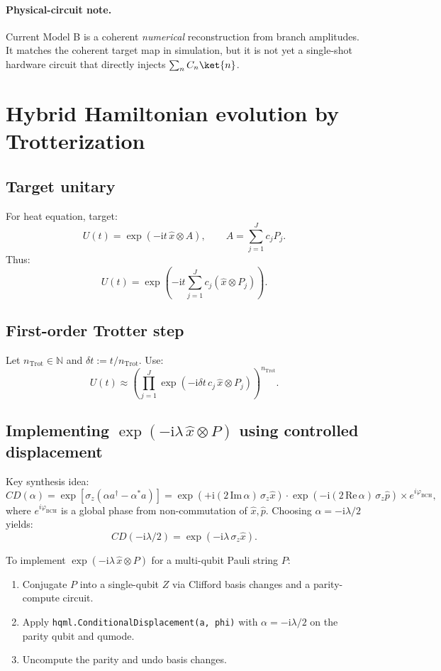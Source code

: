 \documentclass[11pt]{article}
\newcommand{\ii}{\mathrm{i}}
\begin{document}
\paragraph{Physical-circuit note.}
Current Model B is a coherent \emph{numerical} reconstruction from branch amplitudes.
It matches the coherent target map in simulation, but it is not yet a single-shot
hardware circuit that directly injects \(\sum_n C_n\ket{n}\).

\section{Hybrid Hamiltonian evolution by Trotterization}
\label{sec:trotter}

\subsection{Target unitary}
For heat equation, target:
\[
U(t)=\exp(-\ii t\,\hat{x}\otimes A),\qquad A=\sum_{j=1}^{J} c_j P_j.
\]
Thus:
\[
U(t)=\exp\left(-\ii t\sum_{j=1}^{J} c_j(\hat{x}\otimes P_j)\right).
\]

\subsection{First-order Trotter step}
Let $n_{\mathrm{Trot}}\in\mathbb{N}$ and $\delta t:=t/n_{\mathrm{Trot}}$.
Use:
\[
U(t)\approx \left(\prod_{j=1}^{J}\exp(-\ii \delta t\, c_j\,\hat{x}\otimes P_j)\right)^{n_{\mathrm{Trot}}}.
\]

\subsection{Implementing $\exp(-\ii \lambda\,\hat{x}\otimes P)$ using controlled displacement}
Key synthesis idea:
\[
CD(\alpha)=\exp\left[\sigma_z(\alpha a^\dagger-\alpha^*a)\right]
=\exp\left(+\ii(2\,\mathrm{Im}\,\alpha)\,\sigma_z\hat{x}\right)\cdot\exp\left(-\ii(2\,\mathrm{Re}\,\alpha)\,\sigma_z\hat{p}\right)
\times e^{i\varphi_{\mathrm{BCH}}},
\]
where \(e^{i\varphi_{\mathrm{BCH}}}\) is a global phase from non-commutation of \(\hat{x},\hat{p}\).
Choosing $\alpha = -\ii\lambda/2$ yields:
\[
CD(-\ii\lambda/2)=\exp(-\ii\lambda\,\sigma_z\hat{x}).
\]

To implement $\exp(-\ii \lambda\,\hat{x}\otimes P)$ for a multi-qubit Pauli string $P$:
\begin{enumerate}[itemsep=2pt,topsep=2pt]
\item Conjugate $P$ into a single-qubit $Z$ via Clifford basis changes and a parity-compute circuit.
\item Apply \texttt{hqml.ConditionalDisplacement(a, phi)} with $\alpha=-\ii\lambda/2$ on the parity qubit and qumode.
\item Uncompute the parity and undo basis changes.
\end{enumerate}
\end{document}
